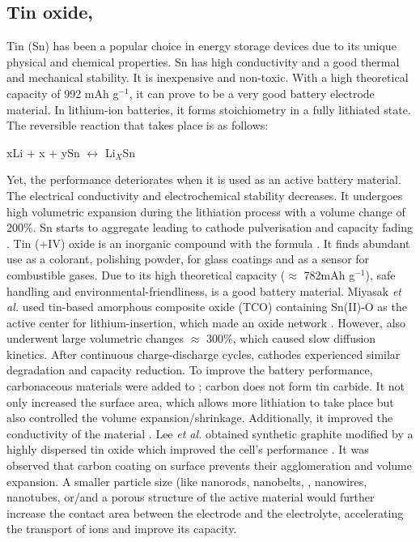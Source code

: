 \subsection*{Tin oxide, }
Tin (Sn) has been a popular choice in energy storage devices due to its unique physical and chemical properties. Sn has high conductivity and a good thermal and mechanical stability. It is inexpensive and non-toxic. With a high theoretical capacity of 992 mAh g$^{-1}$, it can prove to be a very good battery electrode material. In lithium-ion batteries, it forms  stoichiometry in a fully lithiated state. The reversible reaction that takes place is as follows:
\begin{center}
    xLi + x + ySn $\longleftrightarrow$ Li$_X$Sn  
\end{center}
Yet, the performance deteriorates when it is used as an active battery material. The electrical conductivity and electrochemical stability decreases. It undergoes high volumetric expansion during the lithiation process with a volume change of 200\%. Sn starts to aggregate leading to cathode pulverisation and capacity fading \cite{park_effect_2008, zhao_tin-based_2016}.  
Tin (+IV) oxide is an inorganic compound with the formula . It finds abundant use as a colorant, polishing powder, for glass coatings and as a sensor for combustible gases. Due to its high theoretical capacity ($\approx$ 782mAh g$^{-1}$), safe handling and environmental-friendliness,  is a good battery material. Miyasak \textit{et al.} used tin-based amorphous composite oxide (TCO) containing Sn(II)-O as the active center for lithium-insertion, which made an oxide network \cite{idota_tin-based_1997}. However,  also underwent large volumetric changes $\approx$ 300{\%}, which caused slow diffusion kinetics. After continuous charge-discharge cycles, cathodes experienced similar degradation and capacity reduction. To improve the battery performance, carbonaceous materials were added to ; carbon does not form tin carbide. It not only increased the surface area, which allows more lithiation to take place but also controlled the volume expansion/shrinkage. Additionally, it improved the conductivity of the material \cite{nowak_composites_2018}. Lee \textit{et al.} obtained synthetic graphite modified by a highly dispersed tin oxide which improved the cell's performance \cite{navarro-suarez_2d_nodate}. 
It was observed that carbon coating on  surface prevents their agglomeration and volume expansion. A smaller particle size (like nanorods\cite{liu_direct_2009}, nanobelts\cite{duan_single_2005}, , nanowires\cite{huang_situ_2010}, nanotubes\cite{wang_large-scale_2011}, or/and a porous structure of the active material would further increase the contact area between the electrode and the electrolyte, accelerating the transport of ions and improve its capacity. 
